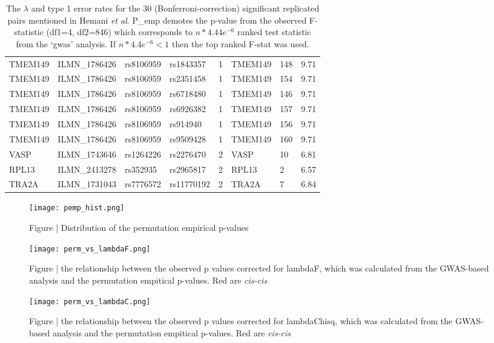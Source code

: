 \documentclass[paper=a4, fontsize=11pt]{scrartcl}         %
\numberwithin{equation}{section}                  %
\numberwithin{figure}{section}                    %
\numberwithin{table}{section}                   %
\begin{document}
\begin{table}[ht]
\begin{tabular}{llllllll}
TMEM149 & ILMN\_1786426 & rs8106959 & rs1843357 & 1 & TMEM149 & 148 & 9.71 \\ 
TMEM149 & ILMN\_1786426 & rs8106959 & rs2351458 & 1 & TMEM149 & 154 & 9.71 \\ 
TMEM149 & ILMN\_1786426 & rs8106959 & rs6718480 & 1 & TMEM149 & 146 & 9.71 \\ 
TMEM149 & ILMN\_1786426 & rs8106959 & rs6926382 & 1 & TMEM149 & 157 & 9.71 \\ 
TMEM149 & ILMN\_1786426 & rs8106959 & rs914940 & 1 & TMEM149 & 156 & 9.71 \\ 
TMEM149 & ILMN\_1786426 & rs8106959 & rs9509428 & 1 & TMEM149 & 160 & 9.71 \\ 
VASP & ILMN\_1743646 & rs1264226 & rs2276470 & 2 & VASP & 10 & 6.81 \\ 
RPL13 & ILMN\_2413278 & rs352935 & rs2965817 & 2 & RPL13 & 2 & 6.57 \\ 
TRA2A & ILMN\_1731043 & rs7776572 & rs11770192 & 2 & TRA2A & 7 & 6.84 \\ 
   \hline
\end{tabular}
\caption*{The $\lambda$ and type 1 error rates for the 30 (Bonferroni-correction) significant replicated pairs mentioned in Hemani \emph{et al}. P\_emp demotes the p-value from the observed F-statistic (df1=4, df2=846) which corresponds to $n*4.44e^{-6}$ ranked test statistic from the ‘gwas’ analysis. If $n*4.4e^{-6} < 1$ then the top ranked F-stat was used.  }
\end{table}


\newpage
\begin{figure}[H]
\centering
\texttt{[image: pemp\_hist.png]}
\caption*{Figure | Distribution of the permutation empirical p-values}
\end{figure}

\newpage

\begin{figure}[H]
\centering
\texttt{[image: perm\_vs\_lambdaF.png]}
\caption*{Figure | the relationship between the observed p values corrected for lambdaF, which was calculated from the GWAS-based analysis and the permutation empitical p-values. Red are \emph{cis-cis}}
\end{figure}

\begin{figure}[H]
\centering
\texttt{[image: perm\_vs\_lambdaC.png]}
\caption*{Figure | the relationship between the observed p values corrected for lambdaChisq, which was calculated from the GWAS-based analysis and the permutation empitical p-values. Red are \emph{cis-cis}}
\end{figure}
\end{document}

